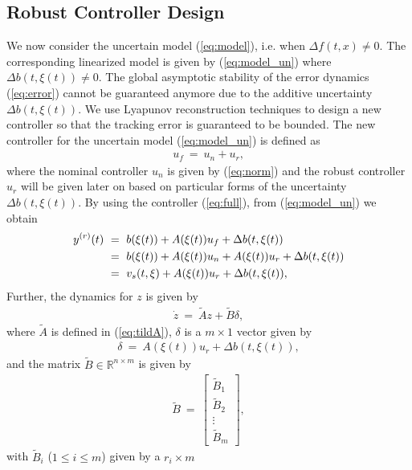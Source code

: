 \documentclass[twoside,leqno,onecolumn]{article}
\begin{document}
\subsection{Robust Controller Design} \label{sec:robust}
We now consider the uncertain model (\ref{eq:model}), i.e. when
$\Delta f(t,x)\neq0$. The corresponding linearized model is given
by (\ref{eq:model_un}) where $\Delta b (t,\xi(t))\neq0$. The
global asymptotic stability of the error dynamics (\ref{eq:error})
cannot be guaranteed anymore due to the additive uncertainty
$\Delta b(t,\xi(t))$. We use  Lyapunov reconstruction techniques
to design a new controller so that the tracking error is
guaranteed to be bounded. The new controller for the uncertain
model (\ref{eq:model_un}) is defined as
\begin{align}
\label{eq:full} u_{f}~=~u_{n} + u_{r},
\end{align}
where the nominal controller $u_{n}$ is given by (\ref{eq:norm})
and the robust controller $u_r$ will be given later on based on
particular forms of the uncertainty $\Delta b(t,\xi(t))$. By using
the controller (\ref{eq:full}), from (\ref{eq:model_un}) we obtain
\begin{align}
\label{eq:io_new}
y^{(r)}(t) &~=~ b(\xi(t)) + A (\xi(t)) u_{f} + \Delta b(t,\xi(t))\notag\\
&~=~ b(\xi(t)) + A (\xi(t)) u_{n} + A (\xi(t)) u_{r}+ \Delta b(t,\xi(t))\notag\\
& ~=~v_{s}(t,\xi)+ A (\xi(t)) u_{r}+ \Delta b(t,\xi(t)),
\end{align}
Further, the dynamics for $z$ is given by
\begin{align}
\label{eq:dyn_z} \dot{z}~=~ \tilde{A} z + \tilde{B} \delta,
\end{align}where $\tilde{A}$ is defined in (\ref{eq:tildA}), $\delta$ is a
$m\times 1$ vector given by
\begin{align}
\label{eq:delta} \delta~=~A (\xi(t)) u_{r}+ \Delta b(t,\xi(t)),
\end{align}
and the matrix $\tilde B\in\mathbb{R}^{n\times m}$ is given by
\begin{align}
\label{eq:tildB} \tilde{B}~=~\left[ \begin{array}{c}
\tilde{B}_1 \\
\tilde{B}_2\\
\vdots\\
\tilde{B}_m
\end{array} \right],
\end{align}
with $\tilde B_i$ ($1\leq i\leq m$) given by a $r_i\times m$
\end{document}
